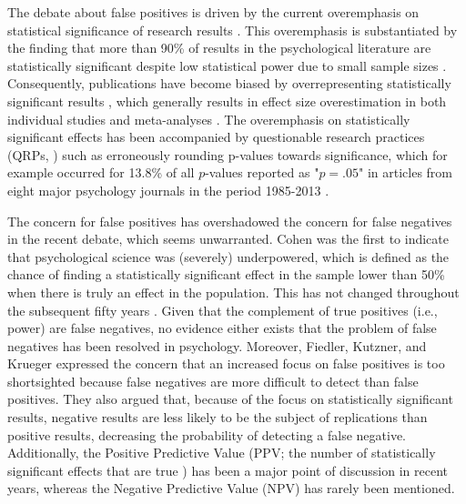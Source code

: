 \documentclass{article}
\begin{document}
The debate about false positives is driven by the current overemphasis on statistical significance of research results \cite{Giner-Sorolla2012-wn}. This overemphasis is substantiated by the finding that more than 90\% of results in the psychological literature are statistically significant \cite{Open_Science_Collaboration2015-zs,Sterling1995-fe,Sterling1959-pf} despite low statistical power due to small sample sizes \cite{Cohen1962-jc,Sedlmeier1989-yc,Marszalek2011-rf,Bakker2012-tf}. Consequently, publications have become biased by overrepresenting statistically significant results \cite{Greenwald1975-ck}, which generally results in effect size overestimation in both individual studies \cite{Nuijten2015-od} and meta-analyses \cite{Van_Assen2015-gg,Lane_1978,Rothstein2005-zg,Borenstein2009-vs}. The overemphasis on statistically significant effects has been accompanied by questionable research practices (QRPs, \cite{John2012-uj}) such as erroneously rounding p-values towards significance, which for example occurred for 13.8\% of all $p$-values reported as "$p =.05$" in articles from eight major psychology journals in the period 1985-2013 \cite{Hartgerink2016-mm}.

The concern for false positives has overshadowed the concern for false negatives in the recent debate, which seems unwarranted. Cohen \cite{Cohen1962-jc} was the first to indicate that psychological science was (severely) underpowered, which is defined as the chance of finding a statistically significant effect in the sample lower than 50\% when there is truly an effect in the population. This has not changed throughout the subsequent fifty years \cite{Bakker2012-tf,Fraley2014-xs}. Given that the complement of true positives (i.e., power) are false negatives, no evidence either exists that the problem of false negatives has been resolved in psychology. Moreover, Fiedler, Kutzner, and Krueger \cite{Fiedler2012-gx} expressed the concern that an increased focus on false positives is too shortsighted because false negatives are more difficult to detect than false positives. They also argued that, because of the focus on statistically significant results, negative results are less likely to be the subject of replications than positive results, decreasing the probability of detecting a false negative. Additionally, the Positive Predictive Value (PPV; the number of statistically significant effects that are true \cite{Ioannidis2005-am}) has been a major point of discussion in recent years, whereas the Negative Predictive Value (NPV) has rarely been mentioned.
\end{document}
